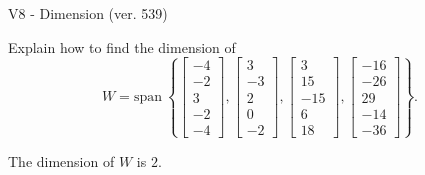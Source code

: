 \begin{exercise}
  \begin{exerciseTitle}V8 - Dimension (ver. 539)\end{exerciseTitle}
  \begin{exerciseStatement}
    Explain how to find the dimension of 
\[W=\mathrm{span}\ \left\{\left[\begin{array}{r}
-4 \\
-2 \\
3 \\
-2 \\
-4
\end{array}\right] , \left[\begin{array}{r}
3 \\
-3 \\
2 \\
0 \\
-2
\end{array}\right] , \left[\begin{array}{r}
3 \\
15 \\
-15 \\
6 \\
18
\end{array}\right] , \left[\begin{array}{r}
-16 \\
-26 \\
29 \\
-14 \\
-36
\end{array}\right]\right\}.\]



  \end{exerciseStatement}
  \begin{exerciseAnswer}
   The dimension of \(W\) is  \(2\).
  


  \end{exerciseAnswer}
\end{exercise}